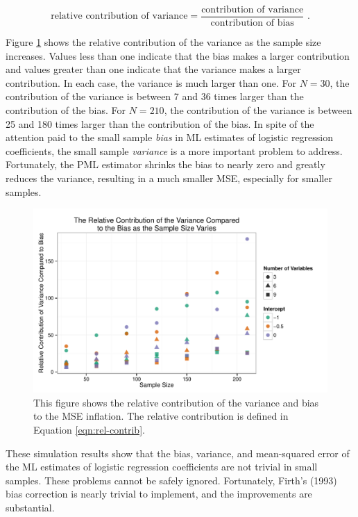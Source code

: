 \documentclass[12pt]{article}
\begin{document}
\begin{equation}\label{eqn:rel-contrib}
\text{relative contribution of variance} = \dfrac{\text{contribution of variance}}{\text{contribution of bias}} \text{ .} 
\end{equation}

\noindent Figure \ref{fig:relcontrib-n-scatter} shows the relative contribution of the variance as the sample size increases. 
Values less than one indicate that the bias makes a larger contribution and values greater than one indicate that the variance makes a larger contribution. 
In each case, the variance is much larger than one. 
For $N = 30$, the contribution of the variance is between 7 and 36 times larger than the contribution of the bias. 
For $N = 210$, the contribution of the variance is between 25 and 180 times larger than the contribution of the bias. 
In spite of the attention paid to the small sample \textit{bias} in ML estimates of logistic regression coefficients, the small sample \textit{variance} is a more important problem to address. 
Fortunately, the PML estimator shrinks the bias to nearly zero and greatly reduces the variance, resulting in a much smaller MSE, especially for smaller samples.
\begin{figure}[h]
\begin{center}
\includegraphics[scale = 0.7]{figs/relcontrib-n-scatter.pdf}
\caption{This figure shows the relative contribution of the variance and bias to the MSE inflation. The relative contribution is defined in Equation \ref{eqn:rel-contrib}.}\label{fig:relcontrib-n-scatter}
\end{center}
\end{figure}

These simulation results show that the bias, variance, and mean-squared error of the ML estimates of logistic regression coefficients are not trivial in small samples. 
These problems cannot be safely ignored. 
Fortunately, Firth's (1993) bias correction is nearly trivial to implement, and the improvements are substantial. 
\end{document}
